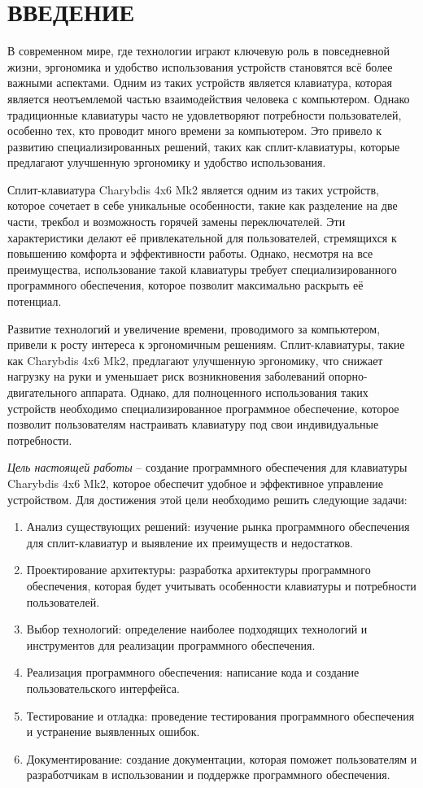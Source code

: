 \section*{ВВЕДЕНИЕ}

В современном мире, где технологии играют ключевую роль в повседневной жизни, эргономика и удобство использования устройств становятся всё более важными аспектами. Одним из таких устройств является клавиатура, которая является неотъемлемой частью взаимодействия человека с компьютером. Однако традиционные клавиатуры часто не удовлетворяют потребности пользователей, особенно тех, кто проводит много времени за компьютером. Это привело к развитию специализированных решений, таких как сплит-клавиатуры, которые предлагают улучшенную эргономику и удобство использования.

Сплит-клавиатура Charybdis 4x6 Mk2 является одним из таких устройств, которое сочетает в себе уникальные особенности, такие как разделение на две части, трекбол и возможность горячей замены переключателей. Эти характеристики делают её привлекательной для пользователей, стремящихся к повышению комфорта и эффективности работы. Однако, несмотря на все преимущества, использование такой клавиатуры требует специализированного программного обеспечения, которое позволит максимально раскрыть её потенциал.

Развитие технологий и увеличение времени, проводимого за компьютером, привели к росту интереса к эргономичным решениям. Сплит-клавиатуры, такие как Charybdis 4x6 Mk2, предлагают улучшенную эргономику, что снижает нагрузку на руки и уменьшает риск возникновения заболеваний опорно-двигательного аппарата. Однако, для полноценного использования таких устройств необходимо специализированное программное обеспечение, которое позволит пользователям настраивать клавиатуру под свои индивидуальные потребности.

\emph{Цель настоящей работы} -- создание программного обеспечения для клавиатуры Charybdis 4x6 Mk2, которое обеспечит удобное и эффективное управление устройством. Для достижения этой цели необходимо решить следующие задачи:

\begin{enumerate}
\item Анализ существующих решений: изучение рынка программного обеспечения для сплит-клавиатур и выявление их преимуществ и недостатков.
\item Проектирование архитектуры: разработка архитектуры программного обеспечения, которая будет учитывать особенности клавиатуры и потребности пользователей.
\item Выбор технологий: определение наиболее подходящих технологий и инструментов для реализации программного обеспечения.
\item Реализация программного обеспечения: написание кода и создание пользовательского интерфейса.
\item Тестирование и отладка: проведение тестирования программного обеспечения и устранение выявленных ошибок.
\item Документирование: создание документации, которая поможет пользователям и разработчикам в использовании и поддержке программного обеспечения.
\end{enumerate}

